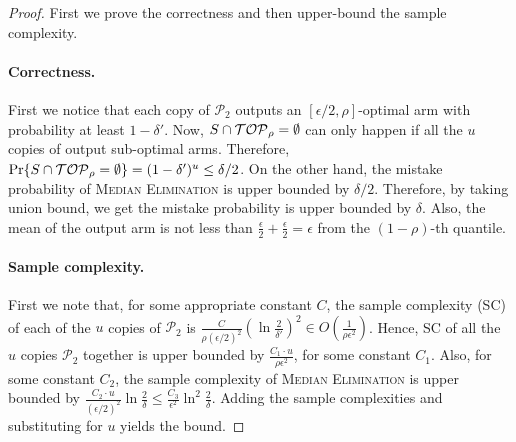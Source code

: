  \begin{proof}
 First we prove the correctness and then upper-bound the sample complexity.

\paragraph{Correctness.} First we notice that each copy of $\mathcal{P}_2$ outputs an $[\epsilon/2, \rho]$-optimal arm
 with probability at least $1-\delta'$. 
 Now, $S \cap {\mathcal{TOP}_\rho} = \emptyset$ can only happen if all the $u$ copies of \PP output sub-optimal arms. Therefore, $\Pr\{S \cap {\mathcal{TOP}_\rho} = \emptyset\} = (1-\delta')^{u} \leq \delta/2$.
  On the other hand, the mistake probability of \textsc{Median Elimination} is upper bounded by $\delta/2$. Therefore, by taking union bound, we get the 
  mistake probability is upper bounded by $\delta$. Also, the mean of the output arm is not
  less than $\frac{\epsilon}{2} + \frac{\epsilon}{2} = \epsilon$ from the $(1-\rho)$-th
  quantile.
  
  \paragraph{Sample complexity.} First we note that, for some appropriate constant $C$,
  the sample complexity (SC) of each of the $u$ copies of $\mathcal{P}_2$ is $\frac{C}{\rho(\epsilon/2)^2}\left(\ln\frac{2}{\delta'}\right)^2 \in O\left(\frac{1}{\rho\epsilon^2}\right)$.
  Hence, SC of all the $u$ copies $\mathcal{P}_2$ together is upper bounded by $\frac{C_1\cdot u}{\rho\epsilon^2}$, for some constant $C_1$.
  Also, for some constant $C_2$, the sample complexity of \textsc{Median Elimination} is upper bounded by $\frac{C_2\cdot u}{ (\epsilon/2)^2}\ln\frac{2}{\delta} \leq \frac{C_3}{\epsilon^2}\ln^2\frac{2}{\delta}$.
  Adding the sample complexities and substituting for $u$ yields the bound.
 \end{proof}
 

